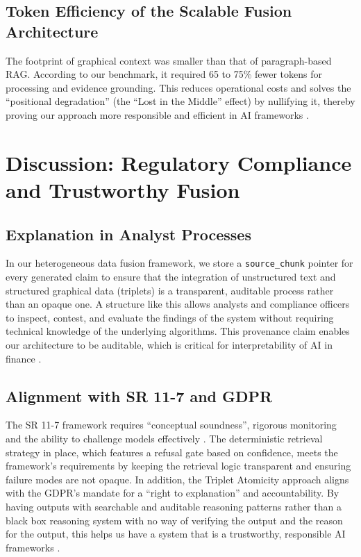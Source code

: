 \documentclass[conference]{IEEEtran}
\begin{document}
\subsection{Token Efficiency of the Scalable Fusion Architecture}
The footprint of graphical context was smaller than that of paragraph-based RAG. According to our benchmark, it required 65 to 75\% fewer tokens for processing and evidence grounding. This reduces operational costs and solves the \enquote{positional degradation} (the \enquote{Lost in the Middle} effect) by nullifying it, thereby proving our approach more responsible and efficient in AI frameworks \cite{liu2024lostmiddle}.

\section{Discussion: Regulatory Compliance and Trustworthy Fusion}
\subsection{Explanation in Analyst Processes}
In our heterogeneous data fusion framework, we store a \texttt{source\_chunk} pointer for every generated claim to ensure that the integration of unstructured text and structured graphical data (triplets) is a transparent, auditable process rather than an opaque one. A structure like this allows analysts and compliance officers to inspect, contest, and evaluate the findings of the system without requiring technical knowledge of the underlying algorithms. This provenance claim enables our architecture to be auditable, which is critical for interpretability of AI in finance \cite{ieeeeadd,kearns2019ethical}.

\subsection{Alignment with SR 11-7 and GDPR}
The SR 11-7 framework requires \enquote{conceptual soundness}, rigorous monitoring and the ability to challenge models effectively \cite{sr117}. The deterministic retrieval strategy in place, which features a refusal gate based on confidence, meets the framework's requirements by keeping the retrieval logic transparent and ensuring failure modes are not opaque. In addition, the Triplet Atomicity approach aligns with the GDPR's mandate for a \enquote{right to explanation} and accountability. By having outputs with searchable and auditable reasoning patterns rather than a black box reasoning system with no way of verifying the output and the reason for the output, this helps us have a system that is a trustworthy, responsible AI frameworks \cite{gdpr,nistairmf,euaiact2024}.
\end{document}
